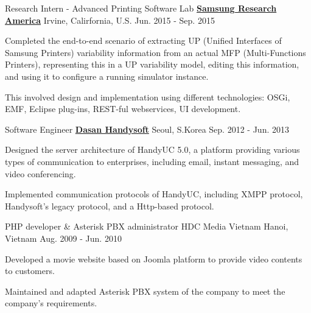 \begin{cventries}
\cventry
{Research Intern -  Advanced Printing Software Lab} %
{\href{http://www.sra.samsung.com}{\bf Samsung Research America}} %
{Irvine, Calirfornia, U.S.} %
{Jun. 2015 - Sep. 2015} %
{
  \begin{cvitems} %
    \item Completed the end-to-end scenario of extracting UP (Unified Interfaces of Samsung Printers) variability information from an actual MFP (Multi-Functions Printers), representing this in a UP variability model, editing this information, and using it to configure a running simulator instance.
    \item This involved design and implementation using different technologies: OSGi, EMF, Eclipse plug-ins, REST-ful webservices, UI development.
  \end{cvitems}
}

\cventry
{Software Engineer} %
{\href{http://www.handysoft.co.kr}{\bf Dasan Handysoft}} %
{Seoul, S.Korea} %
{Sep. 2012 - Jun. 2013} %
{
  \begin{cvitems} %
    \item  Designed the server architecture of HandyUC 5.0, a platform providing various types of communication to enterprises, including email, instant messaging, and video conferencing.
    \item Implemented communication protocols of HandyUC, including XMPP protocol, Handysoft's legacy protocol, and a Http-based protocol.
  \end{cvitems}
}

\cventry
{PHP developer \& Asterisk PBX administrator} %
{HDC Media Vietnam} %
{Hanoi, Vietnam} %
{Aug. 2009 - Jun. 2010} %
{
  \begin{cvitems} %
   \item Developed a movie website based on Joomla platform to provide video contents to customers.
   \item Maintained and adapted Asterisk PBX system of the company to meet the company's requirements.
  \end{cvitems}
}

\end{cventries}

